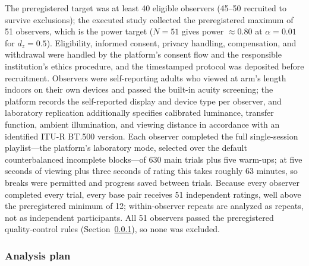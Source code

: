 \documentclass[5p,times,twocolumn]{elsarticle}
\begin{document}
The preregistered target was at least 40 eligible observers (45--50
recruited to survive exclusions); the executed study collected the
preregistered maximum of 51 observers, which is the power target ($N = 51$
gives power $\approx 0.80$ at $\alpha = 0.01$ for $d_z = 0.5$). Eligibility,
informed consent, privacy handling, compensation, and withdrawal were
handled by the platform's consent flow and the responsible institution's
ethics procedure, and the timestamped protocol was deposited before
recruitment. Observers were self-reporting adults who viewed at arm's length
indoors on their own devices and passed the built-in acuity screening; the
platform records the self-reported display and device type per observer, and
laboratory replication additionally specifies calibrated luminance, transfer
function, ambient illumination, and viewing distance in accordance with an
identified ITU-R BT.500 version. Each observer completed the full
single-session playlist---the platform's laboratory mode, selected over the
default counterbalanced incomplete blocks---of 630 main trials plus five
warm-ups; at five seconds of viewing plus three seconds of rating this takes
roughly 63 minutes, so breaks were permitted and progress saved between
trials. Because every observer completed every trial, every base pair
receives 51 independent ratings, well above the preregistered minimum of 12;
within-observer repeats are analyzed as repeats, not as independent
participants. All 51 observers passed the preregistered quality-control
rules (Section~\ref{sec:analysis-plan}), so none was excluded.

\subsubsection{Analysis plan}
\label{sec:analysis-plan}
\end{document}
